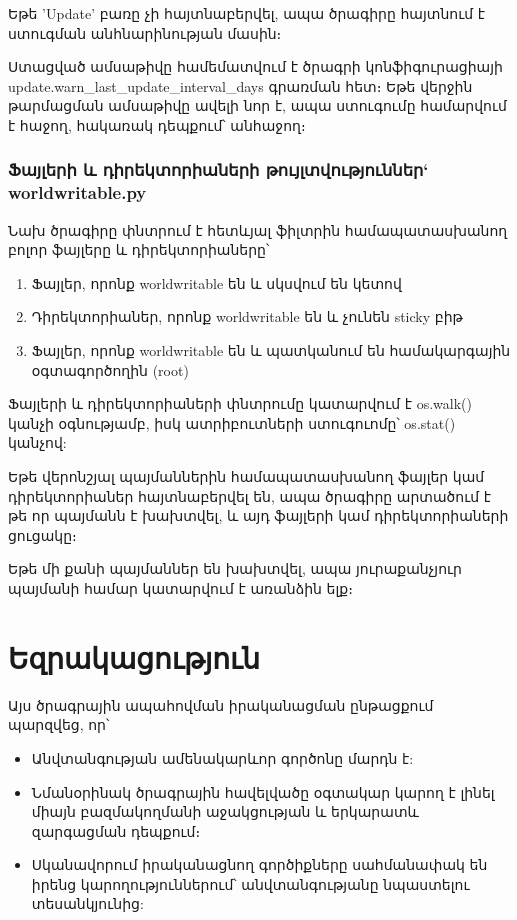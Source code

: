 \documentclass[12pt]{article}
\begin{document}
\begin{sloppypar}
\begin{itemize}
	Եթե 'Update' բառը չի հայտնաբերվել, ապա ծրագիրը հայտնում է ստուգման անհնարինության մասին։
\end{itemize}

Ստացված ամսաթիվը համեմատվում է ծրագրի կոնֆիգուրացիայի
update.warn\_last\_update\_interval\_days
գրառման հետ։ Եթե վերջին թարմացման ամսաթիվը ավելի նոր է,
ապա ստուգումը համարվում է հաջող, հակառակ դեպքում՝ անհաջող։


\subsubsection{Ֆայլերի և դիրեկտորիաների թույլտվություններ` worldwritable.py}


Նախ ծրագիրը փնտրում է հետևյալ ֆիլտրին համապատասխանող բոլոր ֆայլերը և դիրեկտորիաները՝

\begin{enumerate}
\item Ֆայլեր, որոնք worldwritable են և սկսվում են կետով
\item Դիրեկտորիաներ, որոնք worldwritable են և չունեն sticky բիթ
\item Ֆայլեր, որոնք worldwritable են և պատկանում են համակարգային օգտագործողին (root)
\end{enumerate}

Ֆայլերի և դիրեկտորիաների փնտրումը կատարվում է os.walk() կանչի օգնությամբ,
իսկ ատրիբուտների ստուգուոմը՝ os.stat() կանչով:

Եթե վերոնշյալ պայմաններին համապատասխանող ֆայլեր կամ դիրեկտորիաներ հայտնաբերվել են,
ապա ծրագիրը արտածում է թե որ պայմանն է խախտվել, և այդ ֆայլերի կամ դիրեկտորիաների
ցուցակը։

Եթե մի քանի պայմաններ են խախտվել, ապա յուրաքանչյուր պայմանի համար կատարվում է
առանձին ելք։


\newpage
\section{Եզրակացություն}

Այս ծրագրային ապահովման իրականացման ընթացքում պարզվեց, որ՝

\begin{itemize}
\item Անվտանգության ամենակարևոր գործոնը մարդն է:
\item Նմանօրինակ ծրագրային հավելվածը օգտակար կարող է
    լինել միայն բազմակողմանի աջակցության և երկարատև զարգացման
    դեպքում։
\item Սկանավորում իրականացնող գործիքները սահմանափակ են
    իրենց կարողություններում՝ անվտանգությանը նպաստելու
    տեսանկյունից:
\end{itemize}



\end{sloppypar}
\end{document}
